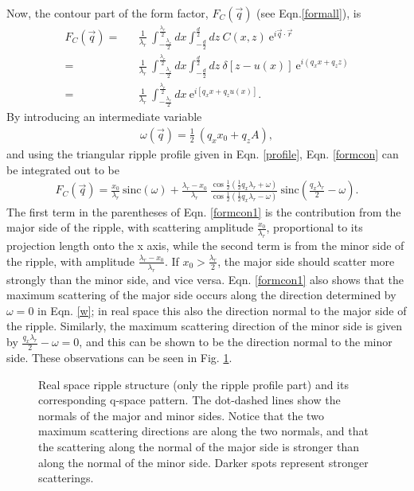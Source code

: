 Now, the contour part of the form factor, $F_C(\vec{q})$ 
(see Eqn.\ref{formall}), is
\begin{eqnarray}
\label{formcon}
F_C(\vec{q}) =&& \frac{1}{\lambda_r}\ \int_{- \frac{\lambda_r}{2}}^{ 
\frac{\lambda_r}{2}} dx
\int_{- \frac{d}{2}}^{\frac{d}{2}} dz\ C(x,z)\ \mbox{e}^{i \vec{q} \cdot \vec{r}} \nonumber\\
=&& \frac{1}{\lambda_r}\ \int_{- \frac{\lambda_r}{2}}^{\frac{\lambda_r}{2}} dx
\int_{- \frac{d}{2}}^{\frac{d}{2}} dz\ \delta [z - u(x)] \ \mbox{e}^{i (q_x x + q_z z)} \nonumber\\
=&& \frac{1}{\lambda_r}\ \int_{- \frac{\lambda_r}{2}}^{\frac{\lambda_r}{2}} dx\ \mbox{e}^{i [q_x x + q_z u(x)]}.
\end{eqnarray}
By introducing an intermediate variable
\begin{eqnarray}
\label{w}
\omega (\vec{q}) = \frac{1}{2}\ ( q_x x_0 + q_z A),
\end{eqnarray}
and using the triangular ripple profile given in Eqn. \ref{profile}, 
Eqn. \ref{formcon} can be integrated out to be
\begin{eqnarray}
\label{formcon1}
F_C(\vec{q}) = \frac{x_0}{\lambda_r}\ \mbox{sinc}(\omega)
+ \frac{\lambda_r - x_0}{\lambda_r}\ \frac{\cos \frac{1}{2} (\frac{1}{2}
q_x \lambda_r + \omega)}{\cos \frac{1}{2} (\frac{1}{2} q_x \lambda_r -
\omega)}\ 
\mbox{sinc}(\frac{q_x \lambda_r}{2} - \omega ).
\end{eqnarray}
The first term in the parentheses of Eqn. \ref{formcon1} is the contribution 
from the major side of the ripple, with scattering amplitude 
\(\frac{x_0}{\lambda_r}\), proportional to its projection length onto the 
x axis, while the second term is from the minor side of the ripple, with 
amplitude \(\frac{\lambda_r - x_0}{\lambda_r}\). 
If $x_0 > \frac{\lambda_r}{2}$, the major side should scatter more strongly
than the minor side, and vice versa. Eqn. \ref{formcon1} also shows that
the maximum scattering of the major side occurs along the direction determined 
by $\omega = 0$ in Eqn. \ref{w}; in real space this also the direction
normal to the major side of the ripple.  Similarly, the maximum scattering
direction of the minor side is given by \( \frac{q_x \lambda_r}{2} - \omega 
= 0 \), and this can be shown to be the direction normal to the minor side.
These observations can be seen in Fig. \ref{q_pattern}.

\begin{figure}
\centerline {}
\vspace{11pt}
\caption{Real space ripple structure (only the ripple profile part) and its 
corresponding q-space pattern. The dot-dashed lines show the normals
of the major and minor sides. Notice that the two maximum
scattering directions are along the two normals, and that
the scattering along the normal of the major side is stronger than
along the normal of the minor side. Darker spots represent stronger
scatterings.
\label{q_pattern}}
\end{figure}

